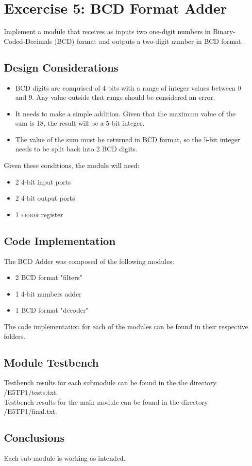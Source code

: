 \section {\color{olive}Excercise 5: BCD Format Adder}
Implement a module that receives as inputs two one-digit numbers in Binary-Coded-Decimals (BCD) format and outputs a two-digit number in BCD format.

\subsection{\color{purple}Design Considerations}
\begin{itemize}
\item BCD digits are comprised of 4 bits with a range of integer values between 0 and 9. Any value outside that range should be considered an error.
\item It needs to make a simple addition. Given that the maximum value of the sum is 18, the result will be a 5-bit integer.
\item The value of the sum must be returned in BCD format, so the 5-bit integer needs to be split back into 2 BCD digits.
\end{itemize}

Given these conditions, the module will need:
\begin{itemize}
\item 2 4-bit input ports
\item 2 4-bit output ports
\item 1 \textsc{error} register
\end{itemize}

\subsection{\color{purple}Code Implementation}
The BCD Adder was composed of the following modules:
\begin{itemize}
\item 2 BCD format "filters"
\item 1 4-bit numbers adder
\item 1 BCD format "decoder"
\end{itemize}

The code implementation for each of the modules can be found in their respective folders.

\subsection{\color{purple}Module Testbench}
Testbench results for each submodule can be found in the the directory /E5TP1/tests.txt.\\
Testbench results for the main module can be found in the directory /E5TP1/final.txt.

\subsection{\color{purple}Conclusions}
Each sub-module is working as intended.
